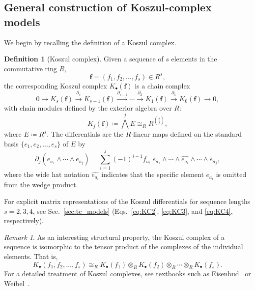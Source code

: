 \documentclass[aps,prx,english,superscriptaddress,twocolumn,tightenlines,showpacs,longbibliography,floatfix,amsfonts]{revtex4-2}
\theoremstyle{remark}
\newtheorem{remark}{Remark}
\theoremstyle{definition}
\newtheorem{definition}{Definition}
\begin{document}
\subsection{General construction of Koszul-complex models}
\label{subsec:general-koszul-models}

We begin by recalling the definition of a Koszul complex.

\begin{definition}[Koszul complex]
	Given a sequence of $s$ elements in the commutative ring $R$,
	\begin{equation}
		\mathbf{f} = (f_1, f_2, \dots, f_s) \in R^s,
	\end{equation}
	the corresponding Koszul complex $K_\bullet(\mathbf{f})$ is a chain complex
	\begin{equation}
		\!\!0 \to K_s(\mathbf{f}) \xrightarrow{\partial_{s}} K_{s-1}(\mathbf{f}) \xrightarrow{\partial_{s-1}} \cdots \xrightarrow{\partial_{2}} K_1(\mathbf{f}) \xrightarrow{\partial_{1}} K_0(\mathbf{f}) \to 0,
	\end{equation}
	with chain modules defined by the exterior algebra over $R$:
	\begin{equation}
		K_j(\mathbf{f}) \coloneqq \bigwedge^{j} E \cong_R R^{\binom{s}{j}},
	\end{equation}
	where $E \coloneqq R^s$. The differentials are the $R$-linear maps defined on the standard basis $\{e_1, e_2, \dots, e_s\}$ of $E$ by
	\begin{equation}
		\partial_j(e_{a_1} \wedge \cdots \wedge e_{a_j}) = \sum_{i=1}^{j} (-1)^{i-1} f_{a_i} \; e_{a_1} \wedge \cdots \wedge \widehat{e_{a_i}} \wedge \cdots \wedge e_{a_j},
	\end{equation}
	where the wide hat notation $\widehat{e_{a_i}}$ indicates that the specific element $e_{a_i}$ is omitted from the wedge product.
\end{definition}



For explicit matrix representations of the Koszul differentials for sequence lengths $s=2,3,4$, see Sec.~\ref{sec:tc_models} (Eqs.~\eqref{eq:KC2}, \eqref{eq:KC3}, and \eqref{eq:KC4}, respectively).


\begin{remark}
	As an interesting structural property, the Koszul complex of a sequence is isomorphic to the tensor product of the complexes of the individual elements. That is,
	\begin{equation}
		K_\bullet(f_1, f_2, \dots, f_s) \cong_R K_\bullet(f_1) \otimes_R K_\bullet(f_2) \otimes_R \cdots \otimes_R K_\bullet(f_s).
	\end{equation}
	For a detailed treatment of Koszul complexes, see textbooks such as Eisenbud~\cite[Chap.~17]{eisenbud1995commutative} or Weibel~\cite[Sec.~4.5]{weibel1994introduction}.
\end{remark}
\end{document}
